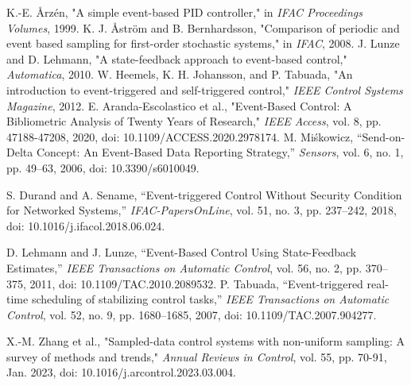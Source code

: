 \documentclass[conference]{IEEEtran}
\begin{document}
\begin{thebibliography}{99}
 K.-E. Årzén, "A simple event-based PID controller," in \textit{IFAC Proceedings Volumes}, 1999.
 K. J. Åström and B. Bernhardsson, "Comparison of periodic and event based sampling for first-order stochastic systems," in \textit{IFAC}, 2008.
 J. Lunze and D. Lehmann, "A state-feedback approach to event-based control," \textit{Automatica}, 2010.
 W. Heemels, K. H. Johansson, and P. Tabuada, "An introduction to event-triggered and self-triggered control," \textit{IEEE Control Systems Magazine}, 2012.
 E. Aranda-Escolastico et al., "Event-Based Control: A Bibliometric Analysis of Twenty Years of Research," \textit{IEEE Access}, vol. 8, pp. 47188-47208, 2020, doi: 10.1109/ACCESS.2020.2978174.
M. Miśkowicz, “Send-on-Delta Concept: An Event-Based Data Reporting Strategy,” \textit{Sensors}, vol. 6, no. 1, pp. 49–63, 2006, doi: 10.3390/s6010049.

S. Durand and A. Sename, “Event-triggered Control Without Security Condition for Networked Systems,” \textit{IFAC-PapersOnLine}, vol. 51, no. 3, pp. 237–242, 2018, doi: 10.1016/j.ifacol.2018.06.024.

D. Lehmann and J. Lunze, “Event-Based Control Using State-Feedback Estimates,” \textit{IEEE Transactions on Automatic Control}, vol. 56, no. 2, pp. 370–375, 2011, doi: 10.1109/TAC.2010.2089532.
P. Tabuada, “Event-triggered real-time scheduling of stabilizing control tasks,” \textit{IEEE Transactions on Automatic Control}, vol. 52, no. 9, pp. 1680–1685, 2007, doi: 10.1109/TAC.2007.904277.

X.-M. Zhang et al., "Sampled-data control systems with non-uniform sampling: A survey of methods and trends," \textit{Annual Reviews in Control}, vol. 55, pp. 70-91, Jan. 2023, doi: 10.1016/j.arcontrol.2023.03.004.
\end{thebibliography}

\appendix
\end{document}
